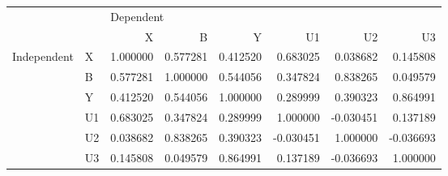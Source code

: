 \begin{tabular}{llrrrrrr}
\toprule
            &    & \multicolumn{6}{l}{Dependent} \\
            &    &         X &         B &         Y &        U1 &        U2 &        U3 \\
\midrule
Independent & X &  1.000000 &  0.577281 &  0.412520 &  0.683025 &  0.038682 &  0.145808 \\
            & B &  0.577281 &  1.000000 &  0.544056 &  0.347824 &  0.838265 &  0.049579 \\
            & Y &  0.412520 &  0.544056 &  1.000000 &  0.289999 &  0.390323 &  0.864991 \\
            & U1 &  0.683025 &  0.347824 &  0.289999 &  1.000000 & -0.030451 &  0.137189 \\
            & U2 &  0.038682 &  0.838265 &  0.390323 & -0.030451 &  1.000000 & -0.036693 \\
            & U3 &  0.145808 &  0.049579 &  0.864991 &  0.137189 & -0.036693 &  1.000000 \\
\bottomrule
\end{tabular}
